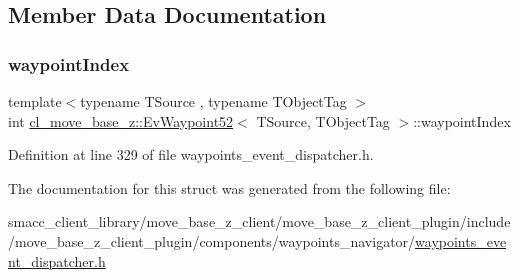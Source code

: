 \subsection{Member Data Documentation}
\mbox{\label{structcl__move__base__z_1_1EvWaypoint52_a1111dd4042495bde499d72976f43732b}} 
\subsubsection{\texorpdfstring{waypoint\+Index}{waypointIndex}}
{\footnotesize\ttfamily template$<$typename T\+Source , typename T\+Object\+Tag $>$ \\
int \hyperlink{structcl__move__base__z_1_1EvWaypoint52}{cl\+\_\+move\+\_\+base\+\_\+z\+::\+Ev\+Waypoint52}$<$ T\+Source, T\+Object\+Tag $>$\+::waypoint\+Index}



Definition at line 329 of file waypoints\+\_\+event\+\_\+dispatcher.\+h.



The documentation for this struct was generated from the following file\+:\begin{DoxyCompactItemize}
\item 
smacc\+\_\+client\+\_\+library/move\+\_\+base\+\_\+z\+\_\+client/move\+\_\+base\+\_\+z\+\_\+client\+\_\+plugin/include/move\+\_\+base\+\_\+z\+\_\+client\+\_\+plugin/components/waypoints\+\_\+navigator/\hyperlink{waypoints__event__dispatcher_8h}{waypoints\+\_\+event\+\_\+dispatcher.\+h}\end{DoxyCompactItemize}
